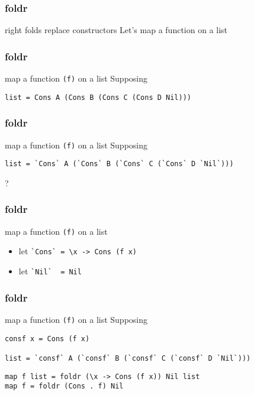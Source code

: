 %

\begin{frame}[fragile]
\frametitle{foldr}
\begin{block}{right folds replace constructors}
Let's map a function on a list
\end{block}
\end{frame}

\begin{frame}[fragile]
\frametitle{foldr}
\begin{block}{map a function \lstinline{(f)} on a list}
Supposing 
\begin{lstlisting}[style=haskell,basicstyle=\tiny\ttfamily,mathescape]
list = Cons A (Cons B (Cons C (Cons D Nil)))
\end{lstlisting}
\end{block}
\end{frame}

\begin{frame}[fragile]
\frametitle{foldr}
\begin{block}{map a function \lstinline{(f)} on a list}
Supposing 
\begin{lstlisting}[style=haskell,basicstyle=\tiny\ttfamily,mathescape]
list = `Cons` A (`Cons` B (`Cons` C (`Cons` D `Nil`)))
\end{lstlisting}
\end{block}
\begin{center}
\LARGE
?
\end{center}
\end{frame}

\begin{frame}[fragile]
\frametitle{foldr}
\begin{block}{map a function \lstinline{(f)} on a list}
\begin{itemize}
\item let \lstinline{`Cons` = \x -> Cons (f x)}
\item let \lstinline{`Nil`  = Nil}
\end{itemize}
\end{block}
\end{frame}

\begin{frame}[fragile]
\frametitle{foldr}
\begin{block}{map a function \lstinline{(f)} on a list}
Supposing
\begin{lstlisting}[style=haskell,basicstyle=\tiny\ttfamily,mathescape]
consf x = Cons (f x)

list = `consf` A (`consf` B (`consf` C (`consf` D `Nil`)))
\end{lstlisting}
\end{block}
\begin{lstlisting}[style=haskell,basicstyle=\scriptsize\ttfamily,mathescape]
map f list = foldr (\x -> Cons (f x)) Nil list
map f = foldr (Cons . f) Nil
\end{lstlisting}
\end{frame}

